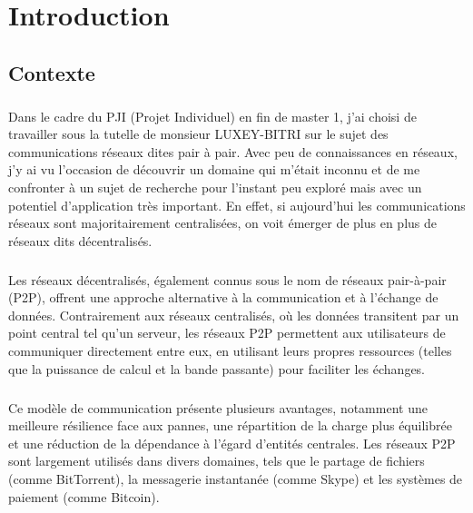 \chapter{Introduction}

\section{Contexte}

\paragraph{}
Dans le cadre du PJI (Projet Individuel) en fin de master 1, j'ai choisi de travailler sous la tutelle de monsieur LUXEY-BITRI sur le sujet des communications réseaux dites pair à pair.
Avec peu de connaissances en réseaux, j'y ai vu l'occasion de découvrir un domaine qui m'était inconnu et de me confronter à un sujet de recherche pour l'instant peu exploré mais 
avec un potentiel d'application très important. En effet, si aujourd'hui les communications réseaux sont majoritairement centralisées, on voit émerger de plus en plus de réseaux
dits décentralisés. 

\paragraph{}
Les réseaux décentralisés, également connus sous le nom de réseaux pair-à-pair (P2P), offrent une approche alternative à la communication et à l'échange de données. Contrairement aux réseaux centralisés, 
où les données transitent par un point central tel qu'un serveur, les réseaux P2P permettent aux utilisateurs de communiquer directement entre eux, en utilisant leurs propres ressources 
(telles que la puissance de calcul et la bande passante) pour faciliter les échanges.

\paragraph{}
Ce modèle de communication présente plusieurs avantages, notamment une meilleure résilience face aux pannes, une répartition de la charge plus équilibrée et une réduction de la dépendance 
à l'égard d'entités centrales. Les réseaux P2P sont largement utilisés dans divers domaines, tels que le partage de fichiers (comme BitTorrent), la messagerie instantanée (comme Skype) 
et les systèmes de paiement (comme Bitcoin).

\newpage


